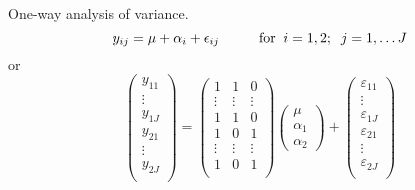 \bexa
One-way analysis of variance.
$$
y_{ij} = \mu + \alpha_i +  \epsilon_{ij}  \hskip1cm {\mbox{for}} \; \;  i = 1,2; \;\; j=1,\ldots J
$$
or
$$
\left( \begin{array}{c}
y_{11} \\ \vdots \\ y_{1J} \\
y_{21} \\ \vdots \\ y_{2J} \\
\end{array} \right) =
\left( \begin{array}{cccc}
1     &    1   &   0  \\ 
\vdots& \vdots &\vdots\\ 
1     &    1   &   0  \\
1     &    0   &   1  \\ 
\vdots& \vdots &\vdots\\ 
1     &    0   &   1  \\ 
\end{array} \right)
\left( \begin{array}{c} \mu\\ \alpha_1 \\ \alpha_2 \end{array} \right) +
\left( \begin{array}{c}
\varepsilon_{11} \\ \vdots \\ \varepsilon_{1J} \\
\varepsilon_{21} \\ \vdots \\ \varepsilon_{2J} \\
\end{array} \right) 
$$
\esexa

